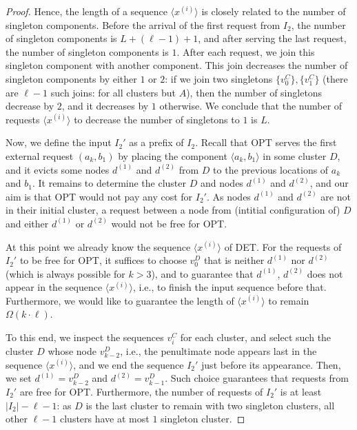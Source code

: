 \begin{proof}
  Hence, the length of a sequence $\langle x^{(i)}\rangle$ is closely related to the number of singleton components.
  Before the arrival of the first request from $I_2$, the number of singleton components is $L + (\ell-1) + 1$, and after serving the last request, the number of singleton components is $1$.
  After each request, we join this singleton component with another component.
  This join decreases the number of singleton components by either $1$ or $2$: if we join two singletons $\{v^C_0\}, \{v^C_1\}$ (there are $\ell-1$ such joins: for all clusters but $A$), then the number of singletons decrease by $2$, and it decreases by $1$ otherwise.
  We conclude that the number of requests $\langle x^{(i)}\rangle$ to decrease the number of singletons to $1$ is $L$.

  \medskip

  Now, we define the input $I_2'$ as a prefix of $I_2$.
  Recall that OPT serves the first external request $(a_k, b_1)$ by placing the component $\langle a_k, b_1\rangle$ in some cluster $D$, and it evicts some nodes $d^{(1)}$ and $d^{(2)}$ from $D$ to the previous locations of $a_k$ and $b_1$.
  It remains to determine the cluster $D$ and nodes $d^{(1)}$ and $d^{(2)}$,
  and our aim is that OPT would not pay any cost for $I_2'$.
  As nodes $d^{(1)}$ and $d^{(2)}$ are not in their initial cluster, a request between a node from (intitial configuration of) $D$ and either $d^{(1)}$ or $d^{(2)}$ would not be free for OPT.
  
  
  At this point we already know the sequence $\langle x^{(i)}\rangle$ of DET.
  For the requests of $I_2'$ to be free for OPT, it suffices to choose $v^D_0$ that is neither $d^{(1)}$ nor $d^{(2)}$ (which is always possible for $k>3$),
  and to guarantee that $d^{(1)}$, $d^{(2)}$ does not appear in the sequence $\langle x^{(i)}\rangle$, i.e., to finish the input sequence before that.
  Furthermore, we would like to guarantee the length of $\langle x^{(i)}\rangle$ to remain $\Omega(k\cdot \ell)$.
  
  To this end, we inspect the sequences $v^{C}_i$ for each cluster, and select such the cluster $D$ whose node $v^{D}_{k-2}$, i.e., the penultimate node appears last in the sequence $\langle x^{(i)}\rangle$, and we end the sequence $I_2'$ just before its appearance.
  Then, we set $d^{(1)} = v^{D}_{k-2}$ and $d^{(2)} = v^{D}_{k-1}$.
  Such choice guarantees that requests from $I_2'$ are free for OPT.
  Furthermore, the number of requests of $I_2'$ is at least $|I_2| - \ell - 1$: as $D$ is the last cluster to remain with two singleton clusters, all other $\ell-1$ clusters have at most $1$ singleton cluster.


\end{proof}
